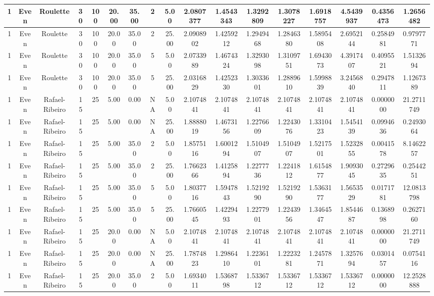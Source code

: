 \documentclass[a4paper]{article}
\begin{document}
\begin{center}
\begin{tabular}{ | c | c | c | c | c | c | c | c | c | c | c | c | c | c | c | c | c | }
		\hline
		1	&	Even	&	Roulette	&	30	&	100	&	20.00	&	35.00	&	2	&	5.00	&	2.0807377	&	1.4543343	&	1.3292809	&	1.3078227	&	1.6918757	&	4.5439937	&	0.4356473	&	1.2656482 \\
		\hline
		1	&	Even	&	Roulette	&	30	&	100	&	20.00	&	35.00	&	2	&	25.00	&	2.0908902	&	1.4259212	&	1.2949468	&	1.2846380	&	1.5895408	&	2.6952144	&	0.2584981	&	0.9797771 \\
		\hline
		1	&	Even	&	Roulette	&	30	&	100	&	20.00	&	35.00	&	5	&	5.00	&	2.0733989	&	1.4674324	&	1.3293098	&	1.3109751	&	1.6943073	&	4.3917407	&	0.4095521	&	1.5132694 \\
		\hline
		1	&	Even	&	Roulette	&	30	&	100	&	20.00	&	35.00	&	5	&	25.00	&	2.0316829	&	1.4252330	&	1.3033601	&	1.2889610	&	1.5998839	&	3.2456840	&	0.2947811	&	1.1267389 \\
		\hline
		1	&	Even	&	Rafael-Ribeiro	&	15	&	25	&	5.00	&	0.00	&	NA	&	5.00	&	2.1074841	&	2.1074841	&	2.1074841	&	2.1074841	&	2.1074841	&	2.1074841	&	0.0000000	&	21.2711749 \\
		\hline
		1	&	Even	&	Rafael-Ribeiro	&	15	&	25	&	5.00	&	0.00	&	NA	&	25.00	&	1.8888019	&	1.4673156	&	1.2276609	&	1.2243076	&	1.3310423	&	1.5454139	&	0.0994636	&	0.2493064 \\
		\hline
		1	&	Even	&	Rafael-Ribeiro	&	15	&	25	&	5.00	&	35.00	&	2	&	5.00	&	1.8575116	&	1.6001294	&	1.5104907	&	1.5104907	&	1.5217501	&	1.5232855	&	0.0041578	&	8.1462257 \\
		\hline
		1	&	Even	&	Rafael-Ribeiro	&	15	&	25	&	5.00	&	35.00	&	2	&	25.00	&	1.7662366	&	1.4125894	&	1.2277736	&	1.2241812	&	1.6154877	&	1.9093045	&	0.2729635	&	0.2544251 \\
		\hline
		1	&	Even	&	Rafael-Ribeiro	&	15	&	25	&	5.00	&	35.00	&	5	&	5.00	&	1.8037716	&	1.5947843	&	1.5219290	&	1.5219290	&	1.5363177	&	1.5653529	&	0.0171781	&	12.0813798 \\
		\hline
		1	&	Even	&	Rafael-Ribeiro	&	15	&	25	&	5.00	&	35.00	&	5	&	25.00	&	1.7660545	&	1.4229493	&	1.2277901	&	1.2243956	&	1.3464547	&	1.8544687	&	0.1368998	&	0.2627160 \\
		\hline
		1	&	Even	&	Rafael-Ribeiro	&	15	&	25	&	20.00	&	0.00	&	NA	&	5.00	&	2.1074841	&	2.1074841	&	2.1074841	&	2.1074841	&	2.1074841	&	2.1074841	&	0.0000000	&	21.2711749 \\
		\hline
		1	&	Even	&	Rafael-Ribeiro	&	15	&	25	&	20.00	&	0.00	&	NA	&	25.00	&	1.7874823	&	1.2986410	&	1.2236101	&	1.2223281	&	1.2457871	&	1.3257694	&	0.0301457	&	0.0754116 \\
		\hline
		1	&	Even	&	Rafael-Ribeiro	&	15	&	25	&	20.00	&	35.00	&	2	&	5.00	&	1.6934011	&	1.5368798	&	1.5336712	&	1.5336712	&	1.5336712	&	1.5336712	&	0.0000000	&	12.2528888 \\

\end{tabular}
\end{center}
\end{document}
